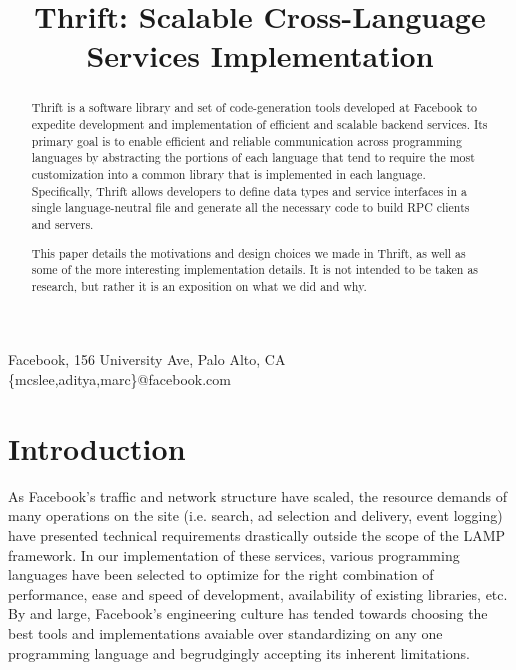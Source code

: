 \documentclass[nocopyrightspace,blockstyle]{sigplanconf}
\begin{document}


\title{Thrift: Scalable Cross-Language Services Implementation}
\subtitle{}

           {Facebook, 156 University Ave, Palo Alto, CA}
           {\{mcslee,aditya,marc\}@facebook.com}

\maketitle

\begin{abstract}
Thrift is a software library and set of code-generation tools developed at
Facebook to expedite development and implementation of efficient and scalable
backend services. Its primary goal is to enable efficient and reliable
communication across programming languages by abstracting the portions of each
language that tend to require the most customization into a common library
that is implemented in each language. Specifically, Thrift allows developers to
define data types and service interfaces in a single language-neutral file
and generate all the necessary code to build RPC clients and servers.

This paper details the motivations and design choices we made in Thrift, as
well as some of the more interesting implementation details. It is not
intended to be taken as research, but rather it is an exposition on what we did
and why.
\end{abstract}




\section{Introduction}
As Facebook's traffic and network structure have scaled, the resource
demands of many operations on the site (i.e. search, 
ad selection and delivery, event logging) have presented technical requirements
drastically outside the scope of the LAMP framework. In our implementation of
these services, various programming languages have been selected to
optimize for the right combination of performance, ease and speed of
development, availability of existing libraries, etc. By and large,
Facebook's engineering culture has tended towards choosing the best
tools and implementations avaiable over standardizing on any one
programming language and begrudgingly accepting its inherent limitations.
\end{document}
